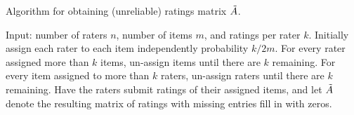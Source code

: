 \begin{algorithm}[b!]
\caption{Algorithm for obtaining (unreliable) ratings matrix $\tilde{A}$.}
\label{alg:create-A}
\begin{algorithmic}[1]
\State Input: number of raters $n$,  number of items $m$, and ratings per rater $k$.
\State Initially assign each rater to each item independently probability $k/2m$.  
\State For every rater assigned more than $k$ items, un-assign items until 
       there are $k$ remaining.
\State For every item assigned to more than $k$
       raters, un-assign raters until there are $k$ remaining.
\State Have the raters submit ratings of their assigned items, and let $\tilde{A}$ 
       denote the resulting matrix of ratings with missing entries fill in with 
       zeros.
\end{algorithmic}
\end{algorithm}


